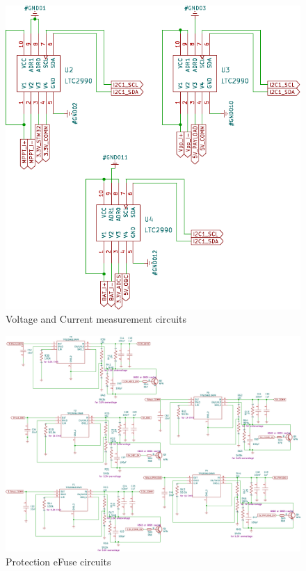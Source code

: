   \begin{figure}[H]
	\centering
	\includegraphics[width=0.9\columnwidth]{FrontMatter/pcb-MeasurementCircuit.pdf}
	\caption{\centering Voltage and Current measurement circuits}
	\label{fig:mes 4lr}
\end{figure}

 
   \begin{figure}[H]
 	\centering
 	\includegraphics[width=0.99\columnwidth]{FrontMatter/pcb-ProtectionCircuit.pdf}
 	\caption{\centering Protection eFuse circuits}
 	\label{fig:protecc 4lr}
 \end{figure}


